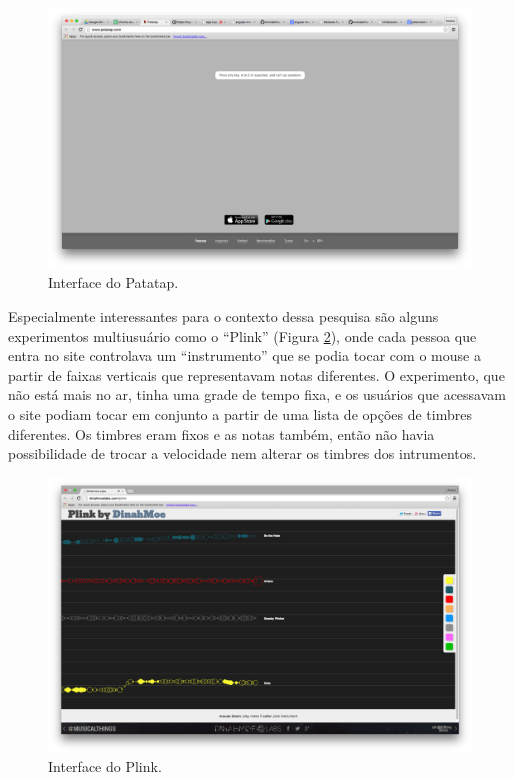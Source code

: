 \begin{figure}
    \caption{\label{patatap}Interface do Patatap.}
    
        \includegraphics[width=1\linewidth]{pictures/cap2/patatap}
    
\end{figure}

Especialmente interessantes para o contexto dessa pesquisa são alguns experimentos multiusuário como o ``Plink'' (Figura \ref{plink}), onde cada pessoa que entra no site controlava um ``instrumento'' que se podia tocar com o mouse a partir de faixas verticais que representavam notas diferentes. O experimento, que não está mais no ar, tinha uma grade de tempo fixa, e os usuários que acessavam o site podiam tocar em conjunto a partir de uma lista de opções de timbres diferentes. Os timbres eram fixos e as notas também, então não havia possibilidade de trocar a velocidade nem alterar os timbres dos intrumentos. 

\begin{figure}
    \caption{\label{plink}Interface do Plink.}
    
        \includegraphics[width=1\linewidth]{pictures/cap2/plink}
    
\end{figure}

